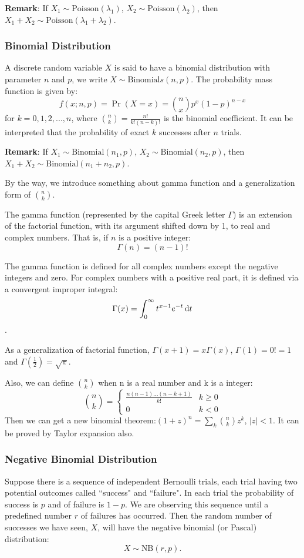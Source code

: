 \documentclass[11pt]{article}
\begin{document}
{\bf Remark}: If $X_1 \sim \mbox{Poisson}(\lambda_1)$, $X_2 \sim \mbox{Poisson}(\lambda_2)$, 
then $X_1 + X_2 \sim \mbox{Poisson}(\lambda_1 + \lambda_2)$.

\subsubsection{Binomial Distribution}
A discrete random variable $X$ is said to have a binomial distribution with parameter $n$ and $p$, we write $X \sim \mbox{Binomial}s(n,p)$. The probability mass function is given by:
\[f(x;n,p) = \Pr(X = x) = {n\choose x}p^x(1-p)^{n-x}\]
for $k=0,1,2,...,n$, where ${n \choose k} = \frac{n!}{k!(n-k)!}$ is the binomial coefficient. It can be interpreted that the probability of exact $k$ successes after $n$ trials.

{\bf Remark}: If $X_1 \sim \mbox{Binomial}(n_1,p)$, $X_2 \sim \mbox{Binomial}(n_2,p)$, 
then $X_1 + X_2 \sim \mbox{Binomial}(n_1+n_2,p)$.

By the way, we introduce something about gamma function and a generalization form of ${n\choose k}$.

The gamma function (represented by the capital Greek letter $\Gamma$) is an extension of the factorial function, with its argument shifted down by 1, to real and complex numbers. That is, if $n$ is a positive integer:
$$\Gamma(n)=(n-1)!$$

The gamma function is defined for all complex numbers except the negative integers and zero. For complex numbers with a positive real part, it is defined via a convergent improper integral:
$$\Gamma(x) = \int_0^\infty t^{x-1} e^{-t}\,{\rm d}t$$.

As a generalization of factorial function, $\Gamma(x+1)=x\Gamma(x)$, $\Gamma(1)=0!=1$ and $ \Gamma(\frac{1}{2})=\sqrt{\pi}$.

Also, we can define ${n\choose k}$ when n is a real number and k is a integer:
\[{n\choose k} = \left\{\begin{array}{cc}
\frac{n(n-1)\dots(n-k+1)}{k!} & k\ge 0 \\
0 & k<0
\end{array}
\right.
\]
Then we can get a new binomial theorem:$(1+z)^n = \sum_{k}{n \choose k}z^k$, $|z|<1$. It can be proved by Taylor expansion also.
\subsubsection{Negative Binomial Distribution}
Suppose there is a sequence of independent Bernoulli trials, each trial having two potential outcomes called ``success" and ``failure". In each trial the probability of success is $p$ and of failure is $1-p$. We are observing this sequence until a predefined number $r$ of failures has occurred. Then the random number of successes we have seen, $X$, will have the negative binomial (or Pascal) distribution:
\[X \sim \mbox{NB}(r, p).\]
\end{document}
